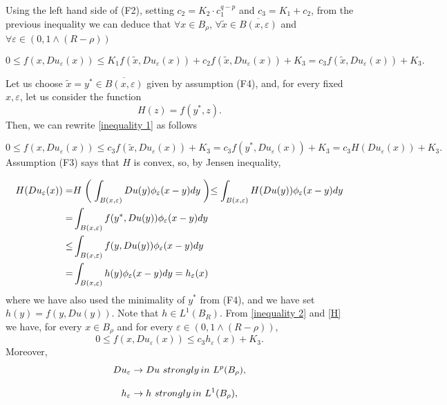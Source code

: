 \documentclass[a4paper,10pt]{article}
\theoremstyle{plain}
\theoremstyle{definition}
\numberwithin{equation}{section} \makeatletter
\begin{document}
\noindent Using the left hand side of (F2),  setting $c_2 = K_2\cdot c_1^{q-p}$ and $c_3=K_1 + c_2$, from the previous inequality we can deduce that 
$ \forall x \in B_{\rho}$, $\forall \tilde{x} \in \overline{B(x,\varepsilon)}$ and $ \forall \varepsilon \in (0, 1\wedge (R-\rho))$

\begin{equation}\label{inequality 1}
 0\le f(x,Du_\varepsilon(x))\le K_1 f(\tilde{x},Du_\varepsilon(x))+c_2 f(\tilde{x},Du_\varepsilon(x))+K_3= c_3 f(\tilde{x},Du_\varepsilon(x))+K_3.
\end{equation}



\noindent Let us choose  $\tilde{x}=y^*\in \overline{B(x,\varepsilon)}$ given by assumption (F4), and, for every fixed  $x, \varepsilon$, let us  consider the function
\[
H(z)=f(y^*,z).
\]
Then, we can rewrite \eqref{inequality 1} as follows

\begin{equation}\label{inequality 2}
 0\le f(x,Du_\varepsilon(x))\le  c_3 f(\tilde{x},Du_\varepsilon(x))+K_3=c_3 f(y^*,Du_\varepsilon(x))+K_3=c_3 H(Du_\varepsilon(x))+K_3.
\end{equation}
Assumption (F3) says that $H$ is convex, so, by Jensen inequality,

\begin{align}\label{H}
H(Du_\varepsilon(x))= & H \biggm( \int_{B(x,\varepsilon)}Du(y)\phi_{\varepsilon}(x-y) dy \biggm)\le \int_{B(x,\varepsilon)}H(Du(y))\phi_{\varepsilon}(x-y) dy \notag \\
=& \int_{B(x,\varepsilon)}f(y^*, Du(y))\phi_{\varepsilon}(x-y) dy \notag \\
\le & \int_{B(x,\varepsilon)}f(y, Du(y))\phi_{\varepsilon}(x-y) dy \notag \\
=& \int_{B(x,\varepsilon)}h(y)\phi_{\varepsilon}(x-y) dy=h_{\varepsilon}(x)
\end{align}
where we have also used the minimality of $y^*$ from (F4), and 
we have set $h(y)=f(y,Du(y))$. Note that $h \in L^1(B_{R})$.
From  \eqref{inequality 2} and \eqref{H} we have,  for every $x \in B_{\rho}$ and for every $  \varepsilon \in (0, 1\wedge  (R-\rho))$,
\[
0\le f(x,Du_\varepsilon(x)) \le c_3 h_{\varepsilon}(x)+K_3.
\]
Moreover,
\[
Du_\varepsilon\rightarrow Du \,\, {\rm strongly\, in} \,\, L^p(B_{\rho}),
\]

\[
h_\varepsilon \rightarrow h \,\, {\rm strongly\, in} \,\,L^1(B_{\rho}),
\]
\end{document}
